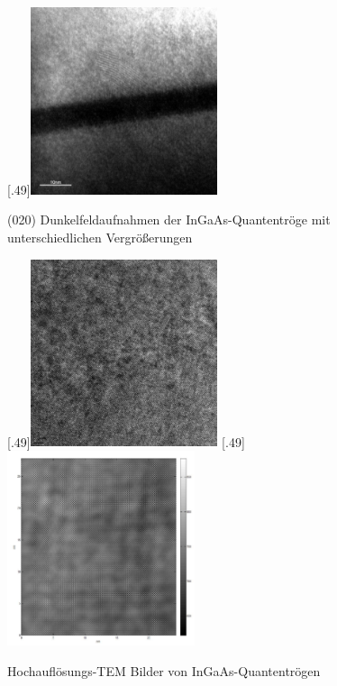 \documentclass[a4paper,11pt,DIV=11]{scrartcl}
\begin{document}
\begin{figure}[htb]
	[.49\linewidth]{\includegraphics[width=0.49\textwidth]{Versuchsdaten/11/380000x.jpg}}
	\caption{(020) Dunkelfeldaufnahmen der InGaAs-Quantentröge mit unterschiedlichen Vergrößerungen} \label{trogdunkel}
\end{figure}

\begin{figure}[htb]\centering
	[.49\linewidth]{\includegraphics[width=0.49\textwidth]{Versuchsdaten/13/good_data/Frame3.jpg}}
	[.49\linewidth]{\includegraphics[width=0.49\textwidth]{Versuchsdaten/13/good_data/Frame3_rotated_and_filtered.jpg}}\\
	\caption{Hochauflösungs-TEM Bilder von InGaAs-Quantentrögen} \label{hoch}
\end{figure}
\end{document}
